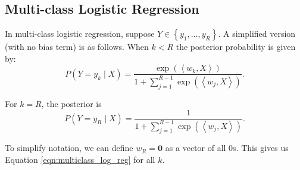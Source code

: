 \documentclass[letterpaper,11pt]{article}
\begin{document}
\subsection*{Multi-class Logistic Regression}

In multi-class logistic regression, suppose
$Y \in \left\{y_1,\ldots,y_R\right\}$. A simplified version (with no
bias term) is as follows. When $k < R$ the posterior probability is given by:
\begin{equation}
  P\left( Y = y_k \mid X\right) =
  \frac{\exp\left(\left\langle w_k, X\right\rangle\right)}
  {1 + \sum_{j=1}^{R-1}\exp\left(\left\langle w_j, X\right\rangle\right)}.
  \label{eqn:multiclass_log_reg}
\end{equation}

For $k = R$, the posterior is
\begin{equation}
  P\left( Y = y_R \mid X\right) =
  \frac{1}
  {1 + \sum_{j=1}^{R-1}\exp\left(\left\langle w_j, X\right\rangle\right)}.
\end{equation}

To simplify notation, we can define $w_R = \mathbf{0}$ as a vector of
all $0$s. This gives us Equation \ref{eqn:multiclass_log_reg} for all
$k$.
\end{document}
